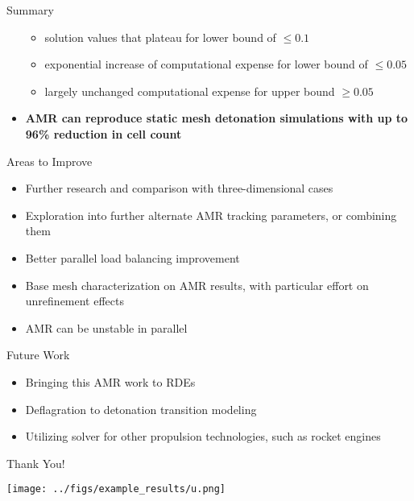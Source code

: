 \begin{frame}[allowframebreaks]{Summary}
\begin{itemize}
\begin{itemize}
    \item solution values that plateau for lower bound of $\leq 0.1$
    \item exponential increase of computational expense for lower bound of $\leq 0.05$
    \item largely unchanged computational expense for upper bound $\geq 0.05$
\end{itemize}
\item \textbf{AMR can reproduce static mesh detonation simulations with up to 96\% reduction in cell count}

\end{itemize}
\end{frame}


\begin{frame}{Areas to Improve}
\begin{itemize}
\item Further research and comparison with three-dimensional cases 
\item Exploration into further alternate AMR tracking parameters, or combining them 
\item Better parallel load balancing improvement 
\item Base mesh characterization on AMR results, with particular effort on unrefinement effects
\item AMR can be unstable in parallel 
\end{itemize}
\end{frame}

\begin{frame}{Future Work}
\begin{itemize}
\item Bringing this AMR work to RDEs
\item Deflagration to detonation transition modeling
\item Utilizing solver for other propulsion technologies, such as rocket engines
\end{itemize}
\end{frame}


\begin{frame}
\begin{center}
\centering    
{\Large Thank You!}

\texttt{[image: ../figs/example\_results/u.png]}
\end{center}
\end{frame}